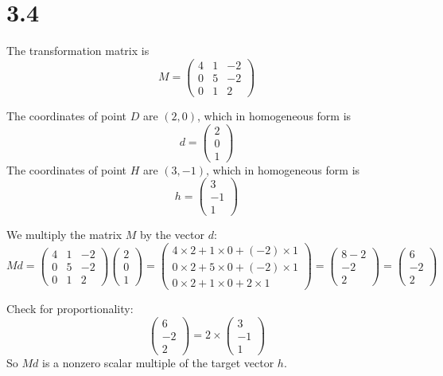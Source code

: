 \documentclass[12pt]{article}
\begin{document}
    \section*{3.4}
    The transformation matrix is
    \[
    M = \begin{pmatrix}
    4 & 1 & -2 \\
    0 & 5 & -2 \\
    0 & 1 & 2
    \end{pmatrix}
    \]

    The coordinates of point $D$ are $(2, 0)$, which in homogeneous form is
    \[
    d = \begin{pmatrix} 2 \\ 0 \\ 1 \end{pmatrix}
    \]
    The coordinates of point $H$ are $(3, -1)$, which in homogeneous form is
    \[
    h = \begin{pmatrix} 3 \\ -1 \\ 1 \end{pmatrix}
    \]

    We multiply the matrix $M$ by the vector $d$:
    \[
    M d = 
    \begin{pmatrix}
    4 & 1 & -2 \\
    0 & 5 & -2 \\
    0 & 1 & 2
    \end{pmatrix}
    \begin{pmatrix} 2 \\ 0 \\ 1 \end{pmatrix}
    =
    \begin{pmatrix}
    4 \times 2 + 1 \times 0 + (-2) \times 1 \\
    0 \times 2 + 5 \times 0 + (-2) \times 1 \\
    0 \times 2 + 1 \times 0 + 2 \times 1
    \end{pmatrix}
    =
    \begin{pmatrix}
    8 - 2 \\
    -2 \\
    2
    \end{pmatrix}
    =
    \begin{pmatrix}
    6 \\ -2 \\ 2
    \end{pmatrix}
    \]

    Check for proportionality:
    \[
    \begin{pmatrix}
    6 \\ -2 \\ 2
    \end{pmatrix}
    = 2 \times
    \begin{pmatrix}
    3 \\ -1 \\ 1
    \end{pmatrix}
    \]
    So $M d$ is a nonzero scalar multiple of the target vector $h$.
\end{document}
